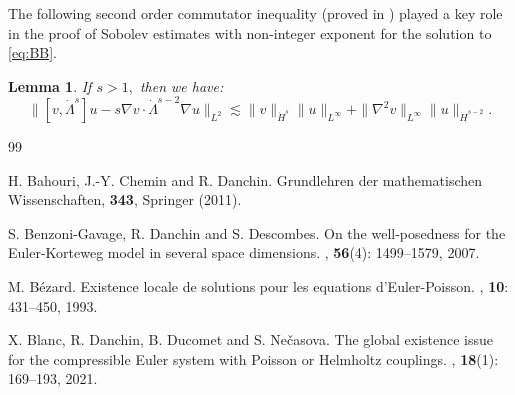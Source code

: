 \documentclass[11pt,twoside]{amsart}
\newtheorem{lem}{Lemma}[section]
\begin{document}
 \medskip 

The following second order commutator inequality (proved in \cite[Lemma A.4]{BDDN}) played a key role in the proof of Sobolev estimates with non-integer exponent for the solution to \eqref{eq:BB}. 

\begin{lem}\label{l:com2} If $s>1,$ then we have:
$$\|[v,\dot\Lambda^s]u-s\nabla v\cdot\dot\Lambda^{s-2}\nabla u\|_{L^2}\lesssim
\|v\|_{\dot H^s}\|u\|_{L^\infty}+\|\nabla^2v\|_{L^\infty}\|u\|_{\dot H^{s-2}}.$$
\end{lem}


\bigskip 


  



\begin{thebibliography}{99}

 H. Bahouri, J.-Y. Chemin and  R. Danchin.
\newblock Grundlehren der mathematischen Wissenschaften, {\bf 343},  Springer (2011).

 S. Benzoni-Gavage, R. Danchin and S. Descombes.
\newblock  On the well-posedness for the Euler-Korteweg model in several space dimensions. 
, {\bf 56}(4): 1499--1579, 2007. 

 M. B\'ezard.
\newblock Existence locale de solutions pour les equations d'Euler-Poisson.
, {\bf 10}: 431--450, 1993.




 X. Blanc, R. Danchin, B. Ducomet and S. Ne\v casova.
\newblock  The global existence issue for the compressible Euler system with Poisson or Helmholtz couplings. 
, {\bf 18}(1): 169--193, 2021.






\end{thebibliography}
\end{document}
